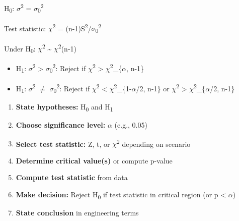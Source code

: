 

H\textsubscript{0}: \ensuremath{\sigma}\textsuperscript{2} = \ensuremath{\sigma}\textsubscript{0}\textsuperscript{2}

Test statistic: \ensuremath{\chi}\textsuperscript{2} = (n-1)S\textsuperscript{2}/\ensuremath{\sigma}\textsubscript{0}\textsuperscript{2}

Under H\textsubscript{0}: \ensuremath{\chi}\textsuperscript{2} \textasciitilde{} \ensuremath{\chi}\textsuperscript{2}(n-1)


\begin{itemize}
\tightlist
\item
  H\textsubscript{1}: \ensuremath{\sigma}\textsuperscript{2} \textgreater{} \ensuremath{\sigma}\textsubscript{0}\textsuperscript{2}: Reject if \ensuremath{\chi}\textsuperscript{2} \textgreater{} \ensuremath{\chi}\textsuperscript{2}\_\{\ensuremath{\alpha}, n-1\}
\item
  H\textsubscript{1}: \ensuremath{\sigma}\textsuperscript{2} \ensuremath{\neq} \ensuremath{\sigma}\textsubscript{0}\textsuperscript{2}: Reject if \ensuremath{\chi}\textsuperscript{2} \textless{} \ensuremath{\chi}\textsuperscript{2}\_\{1-\ensuremath{\alpha}/2, n-1\} or \ensuremath{\chi}\textsuperscript{2} \textgreater{} \ensuremath{\chi}\textsuperscript{2}\_\{\ensuremath{\alpha}/2, n-1\}
\end{itemize}


\begin{enumerate}
\def\labelenumi{\arabic{enumi}.}
\tightlist
\item
  \textbf{State hypotheses:} H\textsubscript{0} and H\textsubscript{1}
\item
  \textbf{Choose significance level:} \ensuremath{\alpha} (e.g., 0.05)
\item
  \textbf{Select test statistic:} Z, t, or \ensuremath{\chi}\textsuperscript{2} depending on scenario
\item
  \textbf{Determine critical value(s)} or compute p-value
\item
  \textbf{Compute test statistic} from data
\item
  \textbf{Make decision:} Reject H\textsubscript{0} if test statistic in critical region (or p \textless{} \ensuremath{\alpha})
\item
  \textbf{State conclusion} in engineering terms
\end{enumerate}

